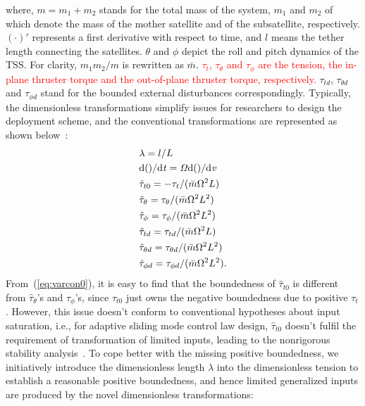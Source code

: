 \documentclass[3p]{elsarticle}
\theoremstyle{plain}
\theoremstyle{remark}
\begin{document}
where, $m = m_1+m_2$ stands for the total mass of the system, $m_1$ and $m_2$ of which denote the mass of the mother satellite and of the subsatellite, respectively. $(\cdot)'$ represents a first derivative with respect to time, and $l$ means the tether length connecting the satellites. $\theta$ and $\phi$ depict the roll and pitch dynamics of the TSS. For clarity, $m_1m_2/m$ is rewritten as $\bar m$. \textcolor{red}{$\tau_t$, $\tau_\theta$ and $\tau_\phi$ are the tension, the in-plane thruster torque and the out-of-plane thruster torque, respectively.} $\tau_{t d}$, $\tau_{\theta d}$ and $\tau_{\phi d}$ stand for the bounded external disturbances correspondingly. Typically, the dimensionless transformations simplify issues for researchers to design the deployment scheme, and the conventional transformations are represented as shown below~\cite{williams2009yes2,wen2015space,wen2016constrained}:
\begin{align}
\begin{split}
&\lambda=l/L\\
&\rm{d}\it{()}/\rm{d}\it{t}=\Omega \rm{d}\it{()}/\rm{d}\it{v}\\
&\hat{\tau}_{t0}=-\tau_t/(\bar{m}\Omega^2L)\\
&\hat{\tau}_\theta=\tau_\theta/(\bar{m}\Omega^2L^2)\\
&\hat{\tau}_\phi = \tau_\phi/(\bar{m}\Omega^2L^2)\\
&\hat{\tau}_{td}=\tau_{td}/(\bar{m}\Omega^2L)\\
&\hat{\tau}_{\theta d}=\tau_{\theta d}/(\bar{m}\Omega^2L^2)\\
&\hat{\tau}_{\phi d}= \tau_{\phi d}/(\bar{m}\Omega^2L^2)\label{eq:varcon0}.
\end{split}
\end{align}
From~(\ref{eq:varcon0}), it is easy to find that the boundedness of $\hat{\tau}_{t0}$ is different from $\hat{\tau}_\theta$'s and $\hat{\tau}_\phi$'s, since $\hat{\tau}_{t0}$ just owns the negative boundedness due to positive $\tau_t$. However, this issue doesn't conform to conventional hypotheses about input saturation, i.e., for adaptive sliding mode control law design, $\hat{\tau}_{t0}$ doesn't fulfil the requirement of transformation of limited inputs, leading to the nonrigorous stability analysis~\cite{Hu2008552,6060930}. To cope better with the missing positive boundedness, we initiatively introduce the dimensionless length $\lambda$ into the dimensionless tension to establish a reasonable positive boundedness, and hence limited generalized inputs are produced by the novel dimensionless transformations:
\end{document}
